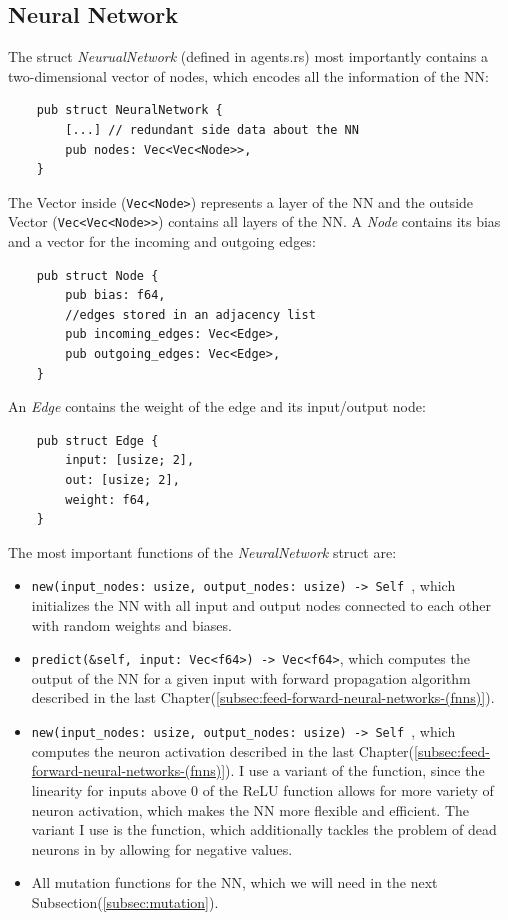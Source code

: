 \documentclass[11pt]{report}
\begin{document}
\begin{enumerate}
            \subsection{Neural Network}\label{subsec:neural-network}
    The struct \textit{NeurualNetwork} (defined in agents.rs) most importantly contains a two-dimensional vector of nodes, which encodes all the information of the NN\@:
    \begin{verbatim}
    pub struct NeuralNetwork {
        [...] // redundant side data about the NN
        pub nodes: Vec<Vec<Node>>,
    }
    \end{verbatim}
    The Vector inside (\texttt{Vec<Node>}) represents a layer of the NN and the outside Vector (\texttt{Vec<Vec<Node>>}) contains all layers of the NN\@.
    A \textit{Node} contains its bias and a vector for the incoming and outgoing edges:
    \begin{verbatim}
    pub struct Node {
        pub bias: f64,
        //edges stored in an adjacency list
        pub incoming_edges: Vec<Edge>,
        pub outgoing_edges: Vec<Edge>,
    }
    \end{verbatim}
    An \textit{Edge} contains the weight of the edge and its input/output node:
    \begin{verbatim}
    pub struct Edge {
        input: [usize; 2],
        out: [usize; 2],
        weight: f64,
    }
    \end{verbatim}
    The most important functions of the \textit{NeuralNetwork} struct are:
    \begin{itemize}
        \item \texttt{new(input_nodes: usize, output_nodes: usize) -> Self {}}, which initializes the NN with all input and output nodes connected to each other with random weights and biases.
        \item \texttt{predict(&self, input: Vec<f64>) -> Vec<f64>}, which computes the output of the NN for a given input with forward propagation algorithm described in the last Chapter(\ref{subsec:feed-forward-neural-networks-(fnns)}).
        \item \texttt{new(input_nodes: usize, output_nodes: usize) -> Self {}}, which computes the neuron activation described in the last Chapter(\ref{subsec:feed-forward-neural-networks-(fnns)}).
        I use a variant of the  function, since the linearity for inputs above 0 of the ReLU function allows for more variety of neuron activation, which makes the NN more flexible and efficient.
        The variant I use is the  function, which additionally tackles the problem of dead neurons in  by allowing for negative values.
        \item All mutation functions for the NN, which we will need in the next Subsection(\ref{subsec:mutation}).
    \end{itemize}

\end{enumerate}
\end{document}
